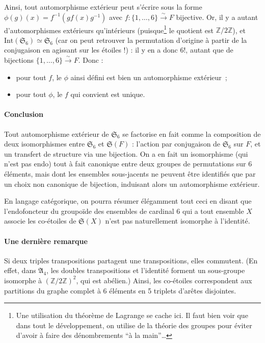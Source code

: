 \documentclass[a4paper, 11pt]{article}
\def\Z{\mathbb{Z}}
\def\Sigmap{\mathfrak{S}}
\begin{document}
Ainsi, tout automorphisme extérieur peut s'écrire sous la forme $\phi(g)(x) =
f^{-1}(gf(x)g^{-1})$ avec $f : \{1, \ldots, 6\} \xrightarrow{\sim} F$ bijective.
Or, il y a autant d'automorphismes extérieurs qu'intérieurs
(puisque\footnote{Une utilisation du théorème de Lagrange se cache ici. Il faut
  bien voir que dans tout le développement, on utilise de la théorie des groupes
  pour éviter d'avoir à faire des dénombrements \enquote{à la main}…} le
quotient est $\Z/2\Z$), et $\mathrm{Int}(\Sigmap_6) \simeq \Sigmap_6$ (car on
peut retrouver la permutation d'origine à partir de la conjugaison en agissant
sur les étoiles !) : il y en a donc $6!$, autant que de bijections $\{1, \ldots,
6\} \xrightarrow{\sim} F$. Donc :
\begin{itemize}
\item pour tout $f$, le $\phi$ ainsi défini est bien un automorphisme
  extérieur~;
\item pour tout $\phi$, le $f$ qui convient est unique.
\end{itemize}

\paragraph{Conclusion} Tout automorphisme extérieur de $\Sigmap_6$ se factorise
en fait comme la composition de deux isomorphismes entre $\Sigmap_6$ et
$\Sigmap(F)$ : l'action par conjugaison de $\Sigmap_6$ sur $F$, et un transfert
de structure via une bijection. On a en fait un isomorphisme (qui n'est pas
endo) tout à fait canonique entre deux groupes de permutations sur 6 éléments,
mais dont les ensembles sous-jacents ne peuvent être identifiés que par un choix
non canonique de bijection, induisant alors un automorphisme extérieur.

En langage catégorique, on pourra résumer élégamment tout ceci en disant que
l'endofoncteur du groupoïde des ensembles de cardinal 6 qui a tout ensemble $X$
associe les co-étoiles de $\Sigmap(X)$ n'est pas naturellement isomorphe à
l'identité.


\paragraph{Une dernière remarque} Si deux triples transpositions partagent une
transpositions, elles commutent. (En effet, dans $\mathfrak{A}_4$, les doubles
transpositions et l'identité forment un sous-groupe isomorphe à $(\Z/2\Z)^2$,
qui est abélien.) Ainsi, les co-étoiles correspondent aux partitions du graphe
complet à 6 éléments en 5 triplets d'arêtes disjointes.
\end{document}
